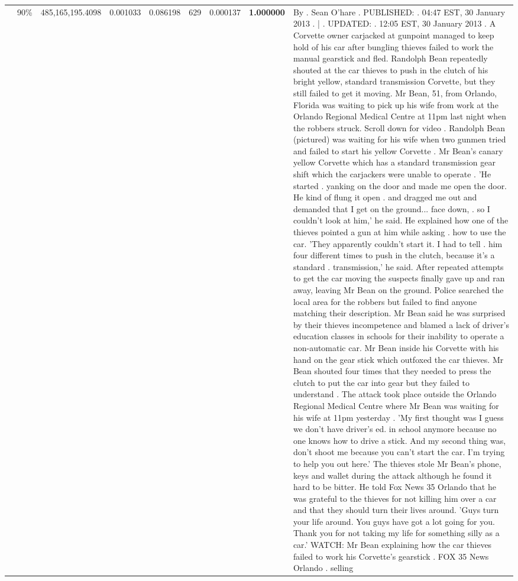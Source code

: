 \begin{table}[H]
\begin{tabular}{llrrrrrrl}
 & 90\% & 485,165,195.4098 & 0.001033 & 0.086198 & \color{red} 629 & 0.000137 & \bfseries \color{red} 1.000000 & By . Sean O'hare . PUBLISHED: . 04:47 EST, 30 January 2013 . | . UPDATED: . 12:05 EST, 30 January 2013 . A Corvette owner carjacked at gunpoint managed to keep hold of his car after bungling thieves failed to work the manual gearstick and fled. Randolph Bean repeatedly shouted at the car thieves to push in the clutch of his bright yellow, standard transmission Corvette, but they still failed to get it moving. Mr Bean, 51, from Orlando, Florida was waiting to pick up his wife from work at the Orlando Regional Medical Centre at 11pm last night when the robbers struck. Scroll down for video . Randolph Bean (pictured) was waiting for his wife when two gunmen tried and failed to start his yellow Corvette . Mr Bean's canary yellow Corvette which has a standard transmission gear shift which the carjackers were unable to operate . 'He started . yanking on the door and made me open the door. He kind of flung it open . and dragged me out and demanded that I get on the ground... face down, . so I couldn't look at him,' he said. He explained how one of the thieves pointed a gun at him while asking . how to use the car. 'They apparently couldn't start it. I had to tell . him four different times to push in the clutch, because it's a standard . transmission,' he said. After repeated attempts to get the car moving the suspects finally gave up and ran away, leaving Mr Bean on the ground. Police searched the local area for the robbers but failed to find anyone matching their description. Mr Bean said he was surprised by their thieves incompetence and blamed a lack of driver's education classes in schools for their inability to operate a non-automatic car. Mr Bean inside his Corvette with his hand on the gear stick which outfoxed the car thieves. Mr Bean shouted four times that they needed to press the clutch to put the car into gear but they failed to understand . The attack took place outside the Orlando Regional Medical Centre where Mr Bean was waiting for his wife at 11pm yesterday . 'My first thought was I guess we don't have driver's ed. in school anymore because no one knows how to drive a stick. And my second thing was, don't shoot me because you can't start the car. I'm trying to help you out here.' The thieves stole Mr Bean's phone, keys and wallet during the attack although he found it hard to be bitter. He told Fox News 35 Orlando that he was grateful to the thieves for not killing him over a car and that they should turn their lives around. 'Guys turn your life around. You guys have got a lot going for you. Thank you for not taking my life for something silly as a car.' WATCH: Mr Bean explaining how the car thieves failed to work his Corvette's gearstick . FOX 35 News Orlando . selling \\

\end{tabular}
\end{table}
